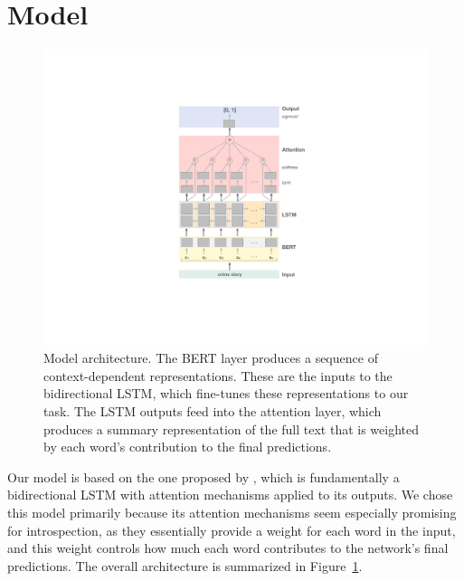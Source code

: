 \documentclass[11pt,a4paper]{article}
\begin{document}

\section{Model}\label{model-architecture}

\begin{figure}[th]
  \includegraphics[width=1\linewidth]{graphs/model.pdf}
  \caption{Model architecture. The BERT layer produces
    a sequence of context-dependent representations. These
    are the inputs to the bidirectional LSTM, which
    fine-tunes these representations to our task.
    The LSTM outputs feed into the attention layer,
    which produces a summary representation of the full
    text that is weighted by each word's contribution
    to the final predictions.}
  \label{fig:model}
\end{figure}

Our model is based on the one proposed by \citeauthor{Lin:2017}, which is fundamentally a  bidirectional LSTM with attention mechanisms applied to its outputs. We chose this model primarily because its attention mechanisms seem especially promising for introspection, as they essentially provide a weight for each word in the input, and this weight controls how much each word contributes to the network's final predictions. The overall architecture is summarized in Figure~\ref{fig:model}.
\end{document}
